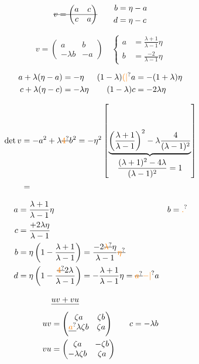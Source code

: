 \[
\deleted{v=\begin{pmatrix}a&c\\c&a\end{pmatrix}}\qquad
\begin{aligned}b&=\eta-a\\d&=\eta-c\end{aligned}
\]

\[
\boxed{v=\begin{pmatrix}a&b\\-\lambda b&-a\end{pmatrix}}
\quad\left\{\begin{aligned}a&=\frac{\lambda+1}{\lambda-1}\eta\\
b&=\frac{-2}{\lambda-1}\eta\end{aligned}\right.
\]

\[
\begin{aligned}
a+\lambda(\eta-a)&=-\eta &(1-\lambda)\unsure{(|{}}a&=-(1+\lambda)\eta\\
c+\lambda(\eta-c)&=-\lambda\eta &(1-\lambda)c&=-2\lambda\eta
\end{aligned}
\]

\[
\begin{aligned}
\det v&=-a^2+\lambda \deleted{\unsure{4}}b^2=-\eta^2
\left[\underbrace{\left(\frac{\lambda+1}{\lambda-1}\right)^2-\lambda\frac{4}{(\lambda-1)^2}}_{\displaystyle\frac{(\lambda+1)^2-4\lambda}{(\lambda-1)^2}=1}\right]\\
&=
\end{aligned}
\]

\[
\begin{aligned}
a&=\frac{\lambda+1}{\lambda-1}\eta &b&=\unsure{.}\\
c&=\frac{+2\lambda\eta}{\lambda-1}\\
b&=\eta\left(1-\frac{\lambda+1}{\lambda-1}\right)=\frac{-2\deleted{\unsure{\lambda}}\eta}{\lambda-1}\deleted{\unsure{\eta}}\\
d&=\eta\left(1-\frac{\deleted{\unsure{4}}2\lambda}{\lambda-1}\right)=-\frac{\lambda+1}{\lambda-1}\eta=\deleted{\unsure{a}}\unsure{-|{}}a
\end{aligned}
\]

\[
\begin{aligned}
&\deleted{uv+vu}\\
uv&=\begin{pmatrix}\zeta a&\zeta b\\\deleted{\unsure{a}}\lambda\zeta b&\zeta a\end{pmatrix}
\qquad c=-\lambda b\\
vu&=\begin{pmatrix}\zeta a&-\zeta b\\-\lambda\zeta b&\zeta a\end{pmatrix}
\end{aligned}
\]

